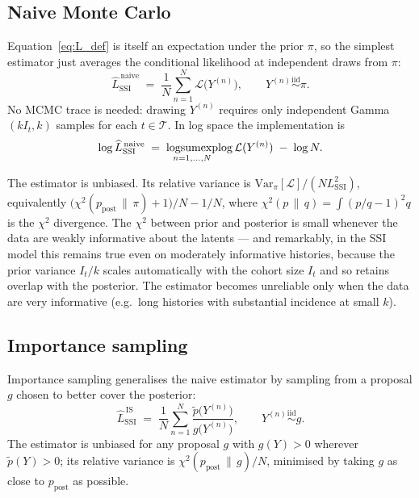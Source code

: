 \documentclass{article}
\theoremstyle{definition}
\begin{document}
\subsection{Naive Monte Carlo}
\label{sec:naive_mc_evidence}

Equation~\eqref{eq:L_def} is itself an expectation under the prior $\pi$,
so the simplest estimator just averages the conditional likelihood at
independent draws from $\pi$:
\begin{equation}\label{eq:L_ssi_naive_mc}
  \widehat L_\mathrm{SSI}^{\,\mathrm{naive}}
  \;=\; \frac{1}{N} \sum_{n=1}^{N} \mathcal L\!\bigl(Y^{(n)}\bigr),
  \qquad Y^{(n)} \stackrel{\mathrm{iid}}{\sim} \pi.
\end{equation}
No MCMC trace is needed: drawing $Y^{(n)}$ requires only independent
Gamma$(kI_t,k)$ samples for each $t \in \mathcal T$.  In log space the
implementation is
\begin{equation*}
  \log \widehat L_\mathrm{SSI}^{\,\mathrm{naive}}
  \;=\; \operatornamewithlimits{logsumexp}_{n=1,\ldots,N}\!\log
  \mathcal L(Y^{(n)}) \;-\; \log N.
\end{equation*}

The estimator is unbiased.  Its relative variance is
$\mathrm{Var}_\pi[\mathcal L]/(N L_\mathrm{SSI}^2)$, equivalently
$\bigl(\chi^2(p_\mathrm{post} \,\|\, \pi) + 1\bigr)/N - 1/N$, where
$\chi^2(p \,\|\, q) = \int (p/q - 1)^2 q$ is the $\chi^2$ divergence.  The
$\chi^2$ between prior and posterior is small whenever the data are
weakly informative about the latents — and remarkably, in the SSI model
this remains true even on moderately informative histories, because the
prior variance $I_t/k$ scales automatically with the cohort size $I_t$
and so retains overlap with the posterior.  The estimator becomes
unreliable only when the data are very informative (e.g.\ long histories
with substantial incidence at small $k$).

\subsection{Importance sampling}
\label{sec:is_evidence}

Importance sampling generalises the naive estimator by sampling from a
proposal $g$ chosen to better cover the posterior:
\begin{equation}\label{eq:L_ssi_is}
  \widehat L_\mathrm{SSI}^{\,\mathrm{IS}}
  \;=\; \frac{1}{N} \sum_{n=1}^{N}
  \frac{\tilde p\!\bigl(Y^{(n)}\bigr)}{g\!\bigl(Y^{(n)}\bigr)},
  \qquad Y^{(n)} \stackrel{\mathrm{iid}}{\sim} g.
\end{equation}
The estimator is unbiased for any proposal $g$ with $g(Y) > 0$ wherever
$\tilde p(Y) > 0$; its relative variance is
$\chi^2(p_\mathrm{post} \,\|\, g)/N$, minimised by taking $g$ as close to
$p_\mathrm{post}$ as possible.
\end{document}
